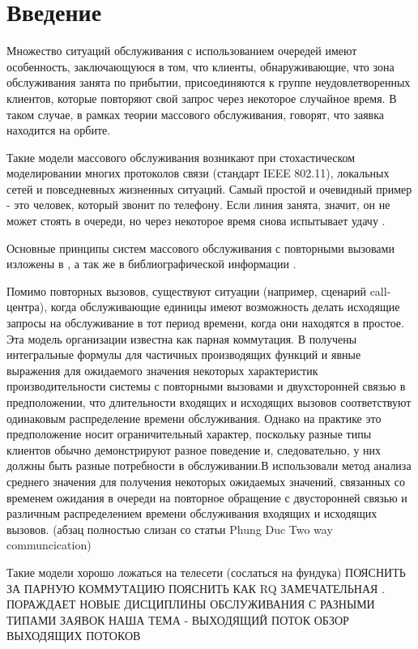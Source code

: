 \section* {Введение}
Множество ситуаций обслуживания с использованием очередей имеют особенность, заключающуюся в том, что клиенты, обнаруживающие, что зона обслуживания занята по прибытии, присоединяются к группе неудовлетворенных клиентов, которые повторяют свой запрос через некоторое случайное время. В таком случае, в рамках теории массового обслуживания, говорят, что заявка находится на орбите.


Такие модели массового обслуживания возникают при стохастическом моделировании многих протоколов связи (стандарт IEEE 802.11), локальных сетей и повседневных жизненных ситуаций. Самый простой и очевидный пример - это человек, который звонит по телефону. Если линия занята, значит, он не может стоять в очереди, но через некоторое время снова испытывает удачу \cite{erlang1909theory}.  


Основные принципы систем массового обслуживания с повторными вызовами изложены в \cite{jesus2008retrial,falin1997retrial}, а так же в библиографической информации \cite{artalejo2010accessible}.

Помимо повторных вызовов, существуют ситуации (например, сценарий call-центра), когда обслуживающие единицы имеют возможность делать исходящие запросы на обслуживание в тот период времени, когда они находятся в простое. Эта модель организации известна как парная коммутация. В \cite{falin1979model} получены интегральные формулы для частичных производящих функций и явные выражения для ожидаемого значения некоторых характеристик производительности системы с повторными вызовами и двухсторонней связью в предположении, что длительности входящих и исходящих вызовов соответствуют одинаковым распределение времени обслуживания. Однако на практике это предположение носит ограничительный характер, поскольку разные типы клиентов обычно демонстрируют разное поведение и, следовательно, у них должны быть разные потребности в обслуживании.В \cite{artalejo2010mean} использовали метод анализа среднего значения для получения некоторых ожидаемых значений, связанных со временем ожидания в очереди на повторное обращение с двусторонней связью и различным распределением времени обслуживания входящих и исходящих вызовов. (абзац полностью слизан со статьи Phung Duc Two way communcication)

Такие модели хорошо ложаться на телесети (сослаться на фундука) ПОЯСНИТЬ ЗА ПАРНУЮ КОММУТАЦИЮ
ПОЯСНИТЬ КАК RQ ЗАМЕЧАТЕЛЬНАЯ . ПОРАЖДАЕТ НОВЫЕ ДИСЦИПЛИНЫ ОБСЛУЖИВАНИЯ С РАЗНЫМИ ТИПАМИ ЗАЯВОК
НАША ТЕМА - ВЫХОДЯЩИЙ ПОТОК
ОБЗОР ВЫХОДЯЩИХ ПОТОКОВ





